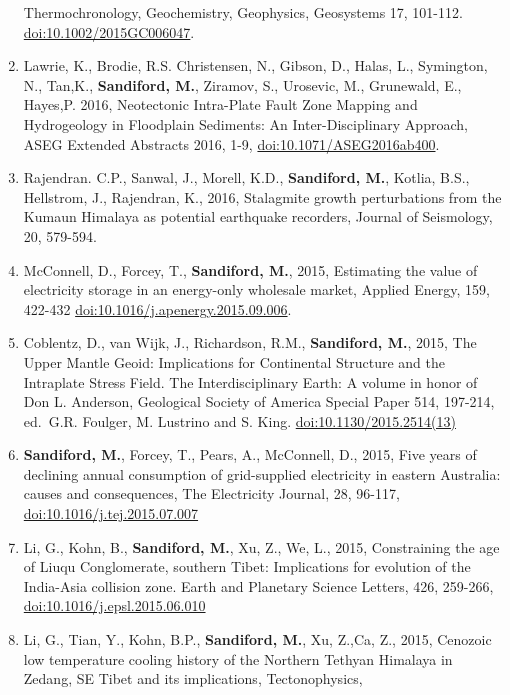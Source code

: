 \documentclass[
]{article}
\begin{document}
\begin{enumerate}
  Thermochronology, Geochemistry, Geophysics, Geosystems 17, 101-112.
  \url{doi:10.1002/2015GC006047}. 
\item
  Lawrie, K., Brodie, R.S. Christensen, N., Gibson, D., Halas, L.,
  Symington, N., Tan,K., \textbf{Sandiford, M.}, Ziramov, S., Urosevic,
  M., Grunewald, E., Hayes,P. 2016, Neotectonic Intra-Plate Fault Zone
  Mapping and Hydrogeology in Floodplain Sediments: An
  Inter-Disciplinary Approach, ASEG Extended Abstracts 2016, 1-9,
  \url{doi:10.1071/ASEG2016ab400}. 
\item
  Rajendran. C.P., Sanwal, J., Morell, K.D., \textbf{Sandiford, M.},
  Kotlia, B.S., Hellstrom, J., Rajendran, K., 2016, Stalagmite growth
  perturbations from the Kumaun Himalaya as potential earthquake
  recorders, Journal of Seismology, 20, 579-594.
\item
  McConnell, D., Forcey, T., \textbf{Sandiford, M.}, 2015, Estimating
  the value of electricity storage in an energy-only wholesale market,
  Applied Energy, 159, 422-432 \url{doi:10.1016/j.apenergy.2015.09.006}.
\item
  Coblentz, D., van Wijk, J., Richardson, R.M., \textbf{Sandiford, M.},
  2015, The Upper Mantle Geoid: Implications for Continental Structure
  and the Intraplate Stress Field. The Interdisciplinary Earth: A volume
  in honor of Don L. Anderson, Geological Society of America Special
  Paper 514, 197-214, ed.~G.R. Foulger, M. Lustrino and S. King.
  \url{doi:10.1130/2015.2514(13)} 
\item
  \textbf{Sandiford, M.}, Forcey, T., Pears, A., McConnell, D., 2015,
  Five years of declining annual consumption of grid-supplied
  electricity in eastern Australia: causes and consequences, The
  Electricity Journal, 28, 96-117, \url{doi:10.1016/j.tej.2015.07.007}
\item
  Li, G., Kohn, B., \textbf{Sandiford, M.}, Xu, Z., We, L., 2015,
  Constraining the age of Liuqu Conglomerate, southern Tibet:
  Implications for evolution of the India-Asia collision zone. Earth and
  Planetary Science Letters, 426, 259-266,
  \url{doi:10.1016/j.epsl.2015.06.010} 
\item
  Li, G., Tian, Y., Kohn, B.P., \textbf{Sandiford, M.}, Xu, Z.,Ca, Z.,
  2015, Cenozoic low temperature cooling history of the Northern Tethyan
  Himalaya in Zedang, SE Tibet and its implications, Tectonophysics,

\end{enumerate}
\end{document}
